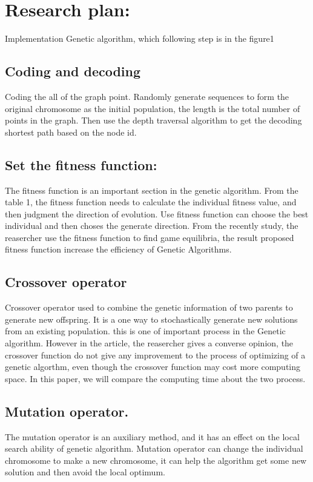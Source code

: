 \documentclass[12pt]{article}
\begin{document}
\section{Research plan:}
Implementation Genetic algorithm, which following step is in the figure1

\subsection{Coding and decoding}
Coding the all of the graph point. Randomly generate sequences to form the original chromosome as the initial population, the length is the total number of points in the graph. Then use the depth traversal algorithm to get the decoding shortest path based on the node id.
\subsection{Set the fitness function:}
The fitness function is an important section in the genetic algorithm. From the table 1, the fitness function needs to calculate the individual fitness value, and then judgment the direction of evolution. Use fitness function can choose the best individual and then choses the generate direction. From the recently study\cite{Gunturu2017}, the reasercher use the fitness function to find game equilibria, the result proposed  fitness function increase the efficiency of Genetic Algorithms. 
\subsection{Crossover operator }
Crossover operator used to combine the genetic information of two parents to generate new offspring. It is a one way to stochastically generate new solutions from an existing population. this is one of important process in the Genetic algorithm. However in the article\cite{Osaba2013}, the reasercher gives a converse opinion, the crossover function do not give any improvement to the process of optimizing of a genetic algorthm, even though the crossover function may cost more computing space. In this paper, we will compare the computing time about the two process.

\subsection{Mutation operator.}
The mutation operator is an auxiliary method, and it has an effect on the local search ability of genetic algorithm. Mutation operator can change the individual chromosome to make a new chromosome, it can help the algorithm get some new solution and then avoid the local optimum.
\end{document}
